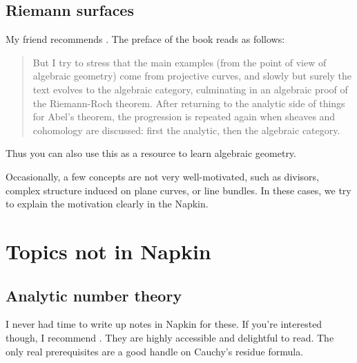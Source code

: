 \subsection{Riemann surfaces}
My friend recommends \cite{ref:miranda}. The preface of the book reads as follows:
\begin{quote}
	But I try to stress that the main examples
	(from the point of view of algebraic geometry) come from projective curves,
	and slowly but surely the text evolves to the algebraic category,
	culminating in an algebraic proof of the Riemann-Roch theorem.
	After returning to the analytic side of things for Abel's theorem,
	the progression is repeated again when sheaves and cohomology are discussed:
	first the analytic, then the algebraic category.
\end{quote}
Thus you can also use this as a resource to learn algebraic geometry.

Occasionally, a few concepts are not very well-motivated, such as divisors,
complex structure induced on plane curves, or line bundles.
In these cases, we try to explain the motivation clearly in the Napkin.

\section{Topics not in Napkin}
\subsection{Analytic number theory}
I never had time to write up notes in Napkin for these.
If you're interested though, I recommend \cite{ref:analytic_NT}.
They are highly accessible and delightful to read.
The only real prerequisites are a good handle on Cauchy's residue formula.
